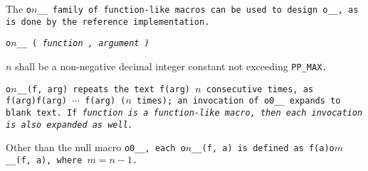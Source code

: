 The \tt{o}$n$\_\_ family of function-like macros can be used to
design \tt{o__}, as is done by the reference implementation.


\tt{o}$n$\tt{__ (} \it{function} \tt{,} \it{argument} \tt{)}


$n$ shall be a non-negative decimal integer constant not exceeding \tt{PP_MAX}.


\tt{o}$n$\tt{__(f, arg)} repeats the text \tt{f(arg)} $n$ consecutive times,
as \tt{f(arg)f(arg)} $\cdots$ \tt{f(arg)} ($n$ times);
an invocation of \tt{o0__} expands to blank text.
If \it{function} is a function-like macro,
then each invocation is also expanded as well.

\note Other than the null macro \tt{o0__}, each \tt{o}$n$\tt{__(f, a)}
is defined as \tt{f(a)o}$m$\tt{__(f, a)}, where $m = n - 1$.
